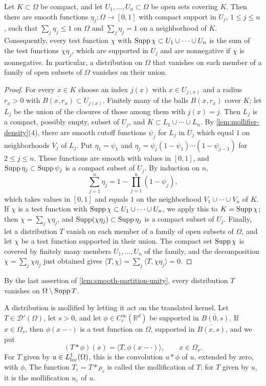 \begin{lemma}\label{lem:smooth-partition-unity}
Let $K\subset\Omega$ be compact, and let $U_1,\ldots,U_n\subset\Omega$ be open sets covering $K$. Then there are smooth functions $\eta_j\colon\Omega\to[0,1]$ with compact support in $U_j$, $1\leq j\leq n$, such that $\sum_j\eta_j\leq1$ on $\Omega$ and $\sum_j\eta_j=1$ on a neighborhood of $K$. Consequently, every test function $\chi$ with $\operatorname{Supp}\chi\subset U_1\cup\cdots\cup U_n$ is the sum of the test functions $\chi\eta_j$, which are supported in $U_j$ and are nonnegative if $\chi$ is nonnegative. In particular, a distribution on $\Omega$ that vanishes on each member of a family of open subsets of $\Omega$ vanishes on their union.
\end{lemma}
\begin{proof}
For every $x\in K$ choose an index $j(x)$ with $x\in U_{j(x)}$ and a radius $r_x>0$ with $\overline{B(x,r_x)}\subset U_{j(x)}$. Finitely many of the balls $B(x,r_x)$ cover $K$; let $L_j$ be the union of the closures of those among them with $j(x)=j$. Then $L_j$ is a compact, possibly empty, subset of $U_j$, and $K\subset L_1\cup\cdots\cup L_n$. By \cref{lem:mollifier-density}(4), there are smooth cutoff functions $\psi_j$ for $L_j$ in $U_j$ which equal $1$ on neighborhoods $V_j$ of $L_j$. Put $\eta_1=\psi_1$ and $\eta_j=\psi_j(1-\psi_1)\cdots(1-\psi_{j-1})$ for $2\leq j\leq n$. These functions are smooth with values in $[0,1]$, and $\operatorname{Supp}\eta_j\subset\operatorname{Supp}\psi_j$ is a compact subset of $U_j$. By induction on $n$,
\[
 \sum_{j=1}^n\eta_j=1-\prod_{j=1}^n(1-\psi_j),
\]
which takes values in $[0,1]$ and equals $1$ on the neighborhood $V_1\cup\cdots\cup V_n$ of $K$. If $\chi$ is a test function with $\operatorname{Supp}\chi\subset U_1\cup\cdots\cup U_n$, we apply this to $K=\operatorname{Supp}\chi$; then $\chi=\sum_j\chi\eta_j$, and $\operatorname{Supp}(\chi\eta_j)\subset\operatorname{Supp}\eta_j$ is a compact subset of $U_j$. Finally, let a distribution $T$ vanish on each member of a family of open subsets of $\Omega$, and let $\chi$ be a test function supported in their union. The compact set $\operatorname{Supp}\chi$ is covered by finitely many members $U_1,\ldots,U_n$ of the family, and the decomposition $\chi=\sum_j\chi\eta_j$ just obtained gives $\langle T,\chi\rangle=\sum_j\langle T,\chi\eta_j\rangle=0$.
\end{proof}

By the last assertion of \cref{lem:smooth-partition-unity}, every distribution $T$ vanishes on $\Omega\setminus\operatorname{Supp} T$.

A distribution is mollified by letting it act on the translated kernel. Let $T\in\mathcal D'(\Omega)$, let $s>0$, and let $\phi\in C_c^\infty(\mathbb R^d)$ be supported in $\overline{B(0,s)}$. If $x\in\Omega_s$, then $\phi(x-\cdot)$ is a test function on $\Omega$, supported in $\overline{B(x,s)}$, and we put
\[
 (T*\phi)(x)=\langle T,\phi(x-\cdot)\rangle,\qquad x\in\Omega_s.
\]
For $T$ given by $u\in L^1_{\mathrm{loc}}(\Omega)$, this is the convolution $u*\phi$ of $u$, extended by zero, with $\phi$. The function $T_\varepsilon=T*\rho_\varepsilon$ is called the mollification of $T$; for $T$ given by $u$, it is the mollification $u_\varepsilon$ of $u$.

